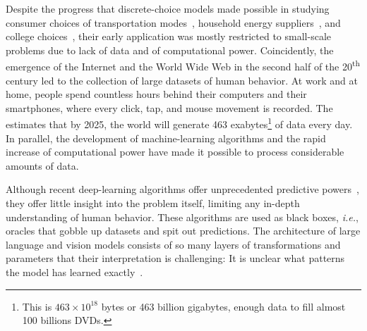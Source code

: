 Despite the progress that discrete-choice models made possible in studying consumer choices of transportation modes~\citep{ben1973structure,mcfadden1974measurement}, household energy suppliers~\citep{goett2000customers}, and college choices~\citep{fuller1982new}, their early application was mostly restricted to small-scale problems due to lack of data and of computational power.
Coincidently, the emergence of the Internet and the World Wide Web in the second half of the 20\textsuperscript{th} century led to the collection of large datasets of human behavior.
At work and at home, people spend countless hours behind their computers and their smartphones, where every click, tap, and mouse movement is recorded.
The~\citet{wef2019data} estimates that by 2025, the world will generate 463 exabytes\footnote{This is $463 \times 10^{18}$ bytes or 463 billion gigabytes, enough data to fill almost 100 billions DVDs.} of data every day.
In parallel, the development of machine-learning algorithms and the rapid increase of computational power have made it possible to process considerable amounts of data.

Although recent deep-learning algorithms offer unprecedented predictive powers~\citep{lecun2015deep}, they offer little insight into the problem itself, limiting any in-depth understanding of human behavior.
These algorithms are used as black boxes, \textit{i.e.}, oracles that gobble up datasets and spit out predictions.
The architecture of large language and vision models consists of so many layers of transformations and parameters that their interpretation is challenging:
It is unclear what patterns the model has learned exactly~\citep{fong2017interpretable,guidotti2018survey,olah2020zoom,hilton2020understanding}.

